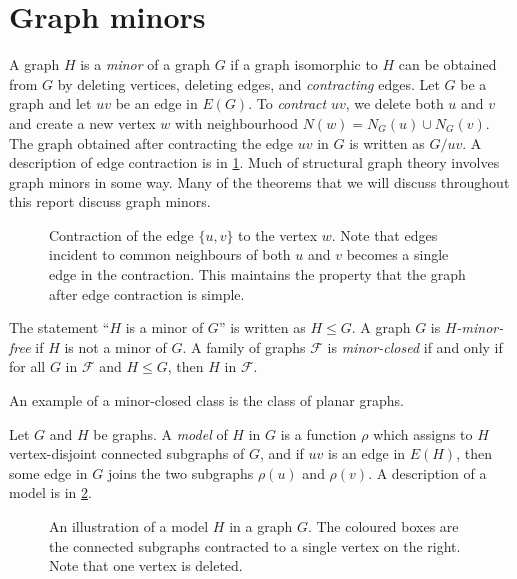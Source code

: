 \section{Graph minors}
A graph \(H\) is a \textit{minor} of a graph \(G\) if a graph isomorphic to \(H\) can be obtained from \(G\) by deleting vertices, deleting edges, and \textit{contracting} edges. Let $G$ be a graph and let $uv$ be an edge in $E(G)$. To \textit{contract} \(uv\), we delete both \(u\) and \(v\) and create a new vertex \(w\) with neighbourhood \(N(w) = N_G(u) \cup N_G(v)\). The graph obtained after contracting the edge \(uv\) in $G$ is written as \(G/uv\).
A description of edge contraction is in \cref{fig:edge_contraction}.  Much of structural graph theory involves graph minors in some way. Many of the theorems that we will discuss throughout this report discuss graph minors. 
\begin{figure}[h!]
	\centering
	
	\caption[Edge contraction]{Contraction of the edge $\{u, v\}$ to the vertex $w$. Note that edges incident to common neighbours of both $u$ and $v$ becomes a single edge in the contraction. This maintains the property that the graph after edge contraction is simple.}\label{fig:edge_contraction}
\end{figure}

The statement ``\(H\) is a minor of \(G\)'' is written as \(H \leq G\). A graph \(G\) is \textit{\(H\)-minor-free} if $H$ is not a minor of $G$. A family of graphs \(\mathcal{F}\) is \textit{minor-closed} if and only if for all $G$ in \(\mathcal{F}\) and \(H \leq G\), then $H$ in \(\mathcal{F}\).

An example of a minor-closed class is the class of planar graphs.

Let $G$ and $H$ be graphs. A \textit{model} of \(H\) in \(G\) is a function $\rho$ which assigns to \(H\) vertex-disjoint connected subgraphs of \(G\), and if $uv$ is an edge in \(E(H)\), then some edge in \(G\) joins the two subgraphs \(\rho(u)\) and \(\rho(v)\). A description of a model is in \cref{fig:model_of_P5}.
\begin{figure}[h!]
	\centering
	
	\caption[A model $H$ in a graph $G$.]{An illustration of a model $H$ in a graph $G$. The coloured boxes are the connected subgraphs contracted to a single vertex on the right. Note that one vertex is deleted.}\label{fig:model_of_P5}
\end{figure}

